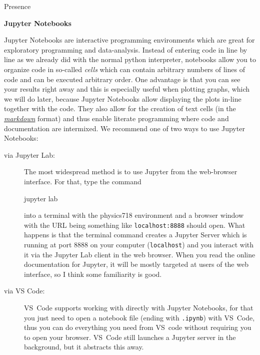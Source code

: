 \documentclass[a4paper, draft=False]{scrartcl}
\begin{document}
\begin{exam}[Presence]{Presence}
\begin{instructions}
        \begin{problem*}\textbf{Jupyter Notebooks}

          Jupyter Notebooks are interactive programming environments which are great
          for exploratory programming and data-analysis. Instead of entering code in
          line by line as we already did with the normal python interpreter,
          notebooks allow you to organize code in so-called \emph{cells} which can
          contain arbitrary numbers of lines of code and can be executed arbitrary
          order. One advantage is that you can see your results right away and this
          is especially useful when plotting graphs, which we will do later, because
          Jupyter Notebooks allow displaying the plots in-line together with the
          code. They also allow for the creation of text cells (in the \href{%
            https://jupyter-notebook.readthedocs.io/en/latest/examples/Notebook/Working%
          }{\emph{markdown}} format) and thus enable literate programming where code
          and documentation are intermixed. We recommend one of two ways to use
          Jupyter Notebooks:

          \begin{description}
          \item[via Jupyter Lab:] The most widespread method is to use Jupyter from the web-browser
            interface. For that, type the command
            \begin{bashcode}
              jupyter lab
            \end{bashcode}
            into a terminal with the physics718 environment and a browser window
            with the URL being something like \texttt{localhost:8888} should open.
            What happens is that the terminal command creates a Jupyter Server which
            is running at port 8888 on your computer (\texttt{localhost}) and you
            interact with it via the Jupyter Lab client in the web browser. When you
            read the online documentation for Jupyter, it will be mostly targeted at
            users of the web interface, so I think some familiarity is good.
          \item[via VS Code:] VS~Code supports working with directly with Jupyter Notebooks, for
            that you just need to open a notebook file (ending with \texttt{.ipynb})
            with VS~Code, thus you can do everything you need from VS~code without
            requiring you to open your browser. VS~Code still launches a Jupyter
            server in the background, but it abstracts this away.
          \end{description}


\end{problem*}
\end{instructions}
\end{exam}
\end{document}
